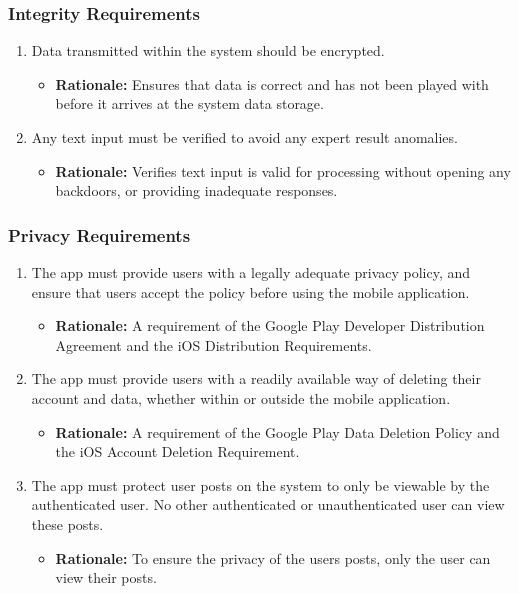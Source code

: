 \documentclass[]{article}
\begin{document}
\subsubsection{Integrity Requirements}
\label{ssub:integrity_requirements}
\begin{enumerate}[{SR-INT}1. ]
\item Data transmitted within the system should be encrypted.
    \begin{itemize}
        \item \textbf{Rationale:} Ensures that data is correct and has not been played with before it arrives at the system data storage.
    \end{itemize}

\item Any text input must be verified to avoid any expert result anomalies.
    \begin{itemize}
        \item \textbf{Rationale:} Verifies text input is valid for processing without opening any backdoors, or providing inadequate responses.
    \end{itemize}
\end{enumerate}

\subsubsection{Privacy Requirements}
\label{ssub:privacy_requirements}
\begin{enumerate}[{SR-P}1. ]
\item The app must provide users with a legally adequate privacy policy, and ensure that users accept the policy before using the mobile application.
    \begin{itemize}
        \item \textbf{Rationale:} A requirement of the Google Play Developer Distribution Agreement and the iOS Distribution Requirements.
    \end{itemize}

\item The app must provide users with a readily available way of deleting their account and data, whether within or outside the mobile application.
    \begin{itemize}
        \item \textbf{Rationale:} A requirement of the Google Play Data Deletion Policy and the iOS Account Deletion Requirement.
    \end{itemize}

\item The app must protect user posts on the system to only be viewable by the authenticated user. No other authenticated or unauthenticated user can view these posts.
    \begin{itemize}
        \item \textbf{Rationale:} To ensure the privacy of the users posts, only the user can view their posts.
    \end{itemize}
\end{enumerate}
\end{document}
